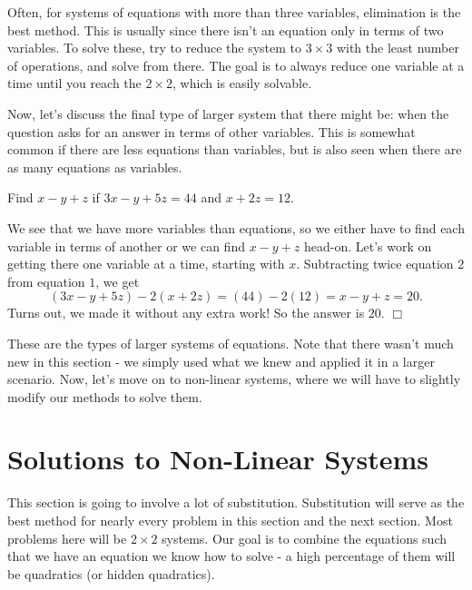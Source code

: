 \documentclass[lang=en,11pt]{elegantbook}
\begin{document}
Often, for systems of equations with more than three variables, elimination is the best method.  This is usually since there isn't an equation only in terms of two variables.  To solve these, try to reduce the system to $3\times 3$ with the least number of operations, and solve from there.  The goal is to always reduce one variable at a time until you reach the $2\times 2$, which is easily solvable.

Now, let's discuss the final type of larger system that there might be: when the question asks for an answer in terms of other variables.  This is somewhat common if there are less equations than variables, but is also seen when there are as many equations as variables.
\begin{example}
Find $x-y+z$ if $3x-y+5z=44$ and $x+2z=12$.
\end{example}
\begin{solution}
We see that we have more variables than equations, so we either have to find each variable in terms of another or we can find $x-y+z$ head-on.  Let's work on getting there one variable at a time, starting with $x$.  Subtracting twice equation $2$ from equation $1$, we get $$(3x-y+5z)-2(x+2z)=(44)-2(12)=x-y+z=20.$$  Turns out, we made it without any extra work!  So the answer is $20$.  $\Box$
\end{solution}
These are the types of larger systems of equations.  Note that there wasn't much new in this section - we simply used what we knew and applied it in a larger scenario.  Now, let's move on to non-linear systems, where we will have to slightly modify our methods to solve them.
\section{Solutions to Non-Linear Systems}
This section is going to involve a lot of substitution.  Substitution will serve as the best method for nearly every problem in this section and the next section.  Most problems here will be $2\times 2$ systems.  Our goal is to combine the equations such that we have an equation we know how to solve - a high percentage of them will be quadratics (or hidden quadratics).  
\end{document}
